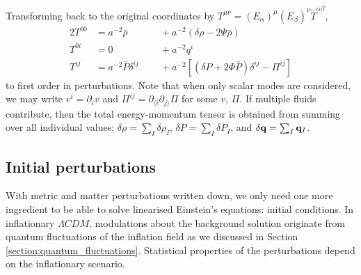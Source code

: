 Transforming back to the original coordinates by $T^{\mu\nu}=(E_\alpha)^\mu (E_\beta)^\nu \tilde{T}^{\alpha\beta}$,
\begin{alignat}{2}
	T^{00} &= a^{-2} \bar{\rho} &&\;\;+ a^{-2}\left( \delta\rho - 2\Psi\bar{\rho} \right) \label{eqn:perturbed_energy_momentum_tensor_1}\\
	T^{0i} &= 0 &&\;\;+ a^{-2} q^i \label{eqn:perturbed_energy_momentum_tensor_2}\\
	T^{ij} &= a^{-2} \bar{P} \delta^{ij} &&\;\;+ a^{-2} \left[ (\delta P + 2\Phi\bar{P})\delta^{ij} - \Pi^{ij} \right]\label{eqn:perturbed_energy_momentum_tensor_3}
\end{alignat}
to first order in perturbations. Note that when only scalar modes are considered, we may write $v^i = \partial_i v$ and $\Pi^{ij} = \partial_{\langle i} \partial_{j \rangle} \Pi$ for some $v$, $\Pi$. If multiple fluids contribute, then the total energy-momentum tensor is obtained from summing over all individual values; $\delta\rho = \sum_I \delta\rho_I$, $\delta P = \sum_I \delta P_I$, and $\delta \mathbf{q} = \sum_I \mathbf{q}_I$.


\subsection{Initial perturbations}

With metric and matter perturbations written down, we only need one more ingredient to be able to solve linearised Einstein's equations: initial conditions. In inflationary $\Lambda CDM$, modulations about the background solution originate from quantum fluctuations of the inflation field as we discussed in Section \ref{section:quantum_fluctuations}. Statistical properties of the perturbations depend on the inflationary scenario.

